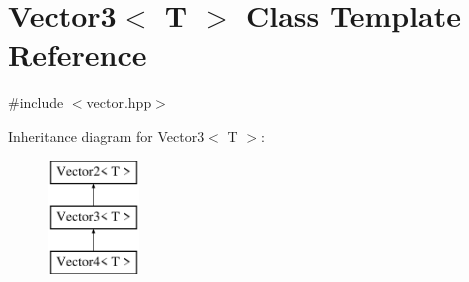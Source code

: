 \hypertarget{class_vector3}{}\section{Vector3$<$ T $>$ Class Template Reference}
\label{class_vector3}


{\ttfamily \#include $<$vector.\+hpp$>$}

Inheritance diagram for Vector3$<$ T $>$\+:\begin{figure}[H]
\begin{center}
\leavevmode
\includegraphics[height=3.000000cm]{class_vector3}
\end{center}
\end{figure}
